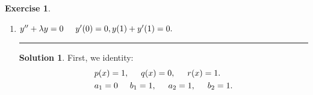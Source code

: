 \documentclass{article}
\theoremstyle{definition}
\newtheorem*{exer*}{Exercise}
\newtheorem*{sln*}{Solution}
\begin{document}
\begin{exer*}
\begin{enumerate}
	 	\newpage
	 	
	 	
	 	\item $y'' + \lambda y = 0\hspace{0.5cm} y'(0) = 0, y(1) + y'(1) = 0. $\\
	 		\noindent\rule{\textwidth}{0.5pt}
	 	\begin{sln*}
	 		First, we identity:
	 		\begin{align*}
	 		&p(x) = 1,\hspace{0.5cm} q(x) = 0,\hspace{0.5cm} r(x) = 1.\\
	 		&a_1 = 0\hspace{0.5cm} b_1 = 1,\hspace{0.5cm}a_2 = 1,\hspace{0.5cm} b_2 = 1.
	 		\end{align*}
	 		

\end{sln*}
\end{enumerate}
\end{exer*}
\end{document}
